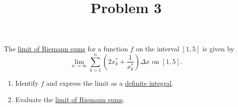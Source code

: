 \documentclass{ximera}
\title[Problem 3]{Problem 3}
\begin{document}
\begin{abstract} \end{abstract}
\maketitle

\begin{problem}
  The \underline{limit of Riemann sums} for a function $f$ on the interval $[1, 5]$ is given by
  \[
    \lim_{n \to\infty} \sum_{k = 1}^n \left(2x_k^* + \frac{1}{x_k^*} \right) \Delta x\mbox{ on $[1, 5]$.}
  \]
  \begin{enumerate}
    \item
      Identify $f$ and express the limit as a \underline{definite integral}.
      
\item
    Evaluate the \underline{limit of Riemann sums}.
    
  \end{enumerate}
  
\end{problem}
\end{document}
